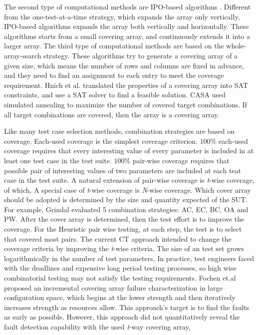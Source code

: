 \documentclass[10pt,conference, compsocconf]{IEEEtran}
\begin{document}
\begin{CJK}{UTF8}{gkai}
The second type of computational methods are IPO-based algorithms \cite{lei08STVR}.
Different from the one-test-at-a-time strategy, which expands the array only
vertically, IPO-based algorithms expands the array both vertically and
horizontally. These algorithms starts from a small covering array, and
continuously extends it into a larger array.
The third type of computational methods are based on the whole-array-search
strategy. These algorithms try to generate a covering array of a given size,
which means the number of rows and columns are fixed in advance, and they need
to find an assignment to each entry to meet the coverage requirement. Hnich et
al. translated the properties of a covering array into SAT constraints, and use
a SAT solver to find a feasible solution. CASA \cite{garvin09SSBSE,garvin11ESE} used simulated annealing
to maximize the number of covered target combinations. If all target
combinations are covered, then the array is a covering array.

Like many test case selection methods, combination strategies are based on coverage\cite{Mats2005testing}.
Each-used coverage is the simplest coverage criterion. $100\%$ each-used coverage
requires that every interesting value of every parameter is included in at least 
one test case in the test suite. $100\%$ pair-wise coverage requires that possible
pair of interesting values of two parameters are included at each teat case in the 
test suite. A natural extension of pair-wise coverage is \emph{t}-wise coverage, of which,
A special case of \emph{t}-wise coverage is \emph{N}-wise coverage.
Which cover array should be adopted is determined by the size and quantity expected of the SUT.
For example, Grindal\cite{Mats2005testing} evaluated 
5 combination strategies: AC, EC, BC, OA and PW.
After the cover array is determined, then the test effort is to improve the coverage. 
For the Heuristic pair wise testing, at each step, the test
is to select that covered most pairs. 
The current CT approach intended to change the coverage criteria by 
improving the \emph{t}-wise criteria. The size of an test set grows 
logarithmically in the number of test parameters\cite{Cohen1997TSE},
In practice, test engineers faced with the deadlines and expensive 
long period testing processes, so high wise combinatorial testing
may not satisfy the testing requirements.
Fochen et.al proposed an incremental covering array failure 
characterization in large configuration space\cite{Fouche2009ISSTA},
which begins at the lower strength and then iteratively 
increases strength as resources allow. 
This approach's target is to find the faults as early as possible. 
However, this approach did not quantitatively reveal the 
fault detection capability with the used \emph{t}-way covering array,


\end{CJK}
\end{document}
